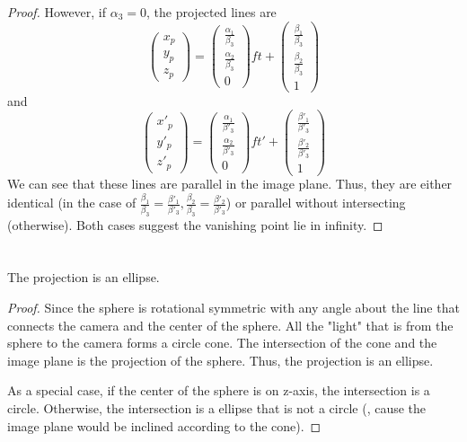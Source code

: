 \documentclass[a4paper,11pt]{article}
\begin{document}
\begin{proof}
However, if $\alpha_3 = 0$, the projected lines are
\[
  \begin{pmatrix} x_p \\ y_p \\ z_p \end{pmatrix} 
  = \begin{pmatrix} \frac{\alpha_1}{\beta_3} \\ \frac{\alpha_2}{\beta_3} \\ 0 \end{pmatrix} ft 
  + \begin{pmatrix} \frac{\beta_1}{\beta_3} \\ \frac{\beta_2}{\beta_3} \\ 1 \end{pmatrix}
\]
and
\[
  \begin{pmatrix} x'_p \\ y'_p \\ z'_p \end{pmatrix} 
  = \begin{pmatrix} \frac{\alpha_1}{\beta'_3} \\ \frac{\alpha_2}{\beta'_3} \\ 0 \end{pmatrix} ft' 
  + \begin{pmatrix} \frac{\beta'_1}{\beta'_3} \\ \frac{\beta'_2}{\beta'_3} \\ 1 \end{pmatrix}
\]
We can see that these lines are parallel in the image plane. Thus, they are either identical (in the case of $ \frac{\beta_1}{\beta_3} = \frac{\beta'_1}{\beta'_3}, \frac{\beta_2}{\beta_3} = \frac{\beta'_2}{\beta'_3} $) or parallel without intersecting (otherwise). Both cases suggest the vanishing point lie in infinity.

\end{proof}

\section{}
The projection is an ellipse.
\begin{proof}
Since the sphere is rotational symmetric with any angle about the line that connects the camera and the center of the sphere. All the "light" that is from the sphere to the camera forms a circle cone. The intersection of the cone and the image plane is the projection of the sphere. Thus, the projection is an ellipse. 

As a special case, if the center of the sphere is on z-axis, the intersection is a circle. Otherwise, the intersection is a ellipse that is not a circle (, cause the image plane would be inclined according to the cone).
\end{proof}
\end{document}
